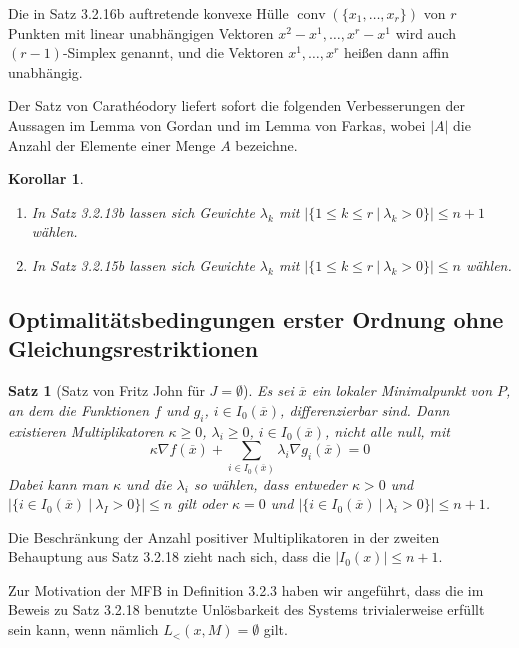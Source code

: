 \documentclass[11pt]{scrreprt}
\newcounter{thm}
\theoremstyle{thmstyle}
\numberwithin{thm}{section}
\newtheorem{korollar}[thm]{Korollar}
\newtheorem{satz}[thm]{Satz}
\begin{document}
Die in Satz 3.2.16b auftretende konvexe Hülle $\operatorname{conv}(\{x_1 , \dotsc , x_r \})$ von $r$ Punkten mit linear unabhängigen Vektoren $x^2 - x^1 , \dotsc, x^r - x^1$ wird auch $(r - 1)$-Simplex genannt, und die Vektoren $x^1, \dotsc, x^r$ heißen dann affin unabhängig. ~\bigskip

Der Satz von Carathéodory liefert sofort die folgenden Verbesserungen der Aussagen im Lemma von Gordan und im Lemma von Farkas, wobei $|A|$ die Anzahl der Elemente einer Menge $A$ bezeichne. 

\begin{korollar} ~\
	\begin{enumerate}[label=\alph*\upshape)]
		\item In Satz 3.2.13b lassen sich Gewichte $\lambda_k$ mit $|\{ 1 \leq k \leq r ~|~\lambda_k > 0\}| \leq n+1$ wählen.
		\item In Satz 3.2.15b lassen sich Gewichte $\lambda_k$ mit $|\{ 1 \leq k \leq r ~|~\lambda_k > 0\}| \leq n$ wählen.
	\end{enumerate}
\end{korollar}

\subsection*{Optimalitätsbedingungen erster Ordnung ohne Gleichungsrestriktionen}

\begin{satz}[Satz von Fritz John für $J = \emptyset$]
	Es sei $\overline{x}$ ein lokaler Minimalpunkt von $P$, an dem die Funktionen $f$ und $g_i$, $i \in I_0(\overline{x})$, differenzierbar sind. Dann existieren Multiplikatoren $\kappa \geq 0$, $\lambda_i \geq 0$, $i \in I_0(\overline{x})$, nicht alle null, mit
	\begin{equation}
		\kappa \nabla f(\overline{x}) + \sum_{i \in I_0(\overline{x})} \lambda_i \nabla g_i(\overline{x}) = 0 \tag*{(3.3)}
	\end{equation} 
	Dabei kann man $\kappa$ und die $\lambda_i$ so wählen, dass entweder $\kappa > 0$ und $|\{ i \in I_0(\overline{x}) ~|~\lambda_I > 0 \} | \leq n$ gilt oder $\kappa = 0$ und $|\{ i \in I_0(\overline{x}) ~|~\lambda_i > 0 \} | \leq n + 1$.
\end{satz}
 
Die Beschränkung der Anzahl positiver Multiplikatoren in der zweiten Behauptung aus Satz 3.2.18 zieht nach sich, dass die $|I_0(x)| \leq n + 1$. ~\bigskip
 
Zur Motivation der MFB in Definition 3.2.3 haben wir angeführt, dass die im Beweis zu Satz 3.2.18 benutzte Unlösbarkeit des Systems trivialerweise erfüllt sein kann, wenn nämlich $L_< (x, M) = \emptyset$ gilt. 
 
\end{document}
